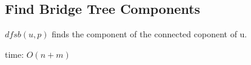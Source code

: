 \subsection{Find Bridge Tree Components}

$dfsb(u, p)$ finds the component of the connected coponent of u.

time: $O(n + m)$
